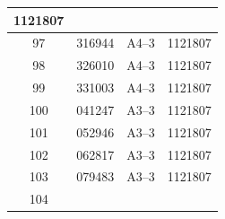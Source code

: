 \documentclass[UTF8,10pt,a4paper,fontset=fandol]{ctexart}
\newcommand{\fieldvalue}[1]{#1}
\begin{document}
\begin{center}
\begin{tabular}{|c|l|c|c|}
\fieldvalue{1121807}
\\ \hline
\fieldvalue{97} &
\fieldvalue{316944} &
\fieldvalue{A4--3} &
\fieldvalue{1121807}
\\ \hline
\fieldvalue{98} &
\fieldvalue{326010} &
\fieldvalue{A4--3} &
\fieldvalue{1121807}
\\ \hline
\fieldvalue{99} &
\fieldvalue{331003} &
\fieldvalue{A4--3} &
\fieldvalue{1121807}
\\ \hline
\fieldvalue{100} &
\fieldvalue{041247} &
\fieldvalue{A3--3} &
\fieldvalue{1121807}
\\ \hline
\fieldvalue{101} &
\fieldvalue{052946} &
\fieldvalue{A3--3} &
\fieldvalue{1121807}
\\ \hline
\fieldvalue{102} &
\fieldvalue{062817} &
\fieldvalue{A3--3} &
\fieldvalue{1121807}
\\ \hline
\fieldvalue{103} &
\fieldvalue{079483} &
\fieldvalue{A3--3} &
\fieldvalue{1121807}
\\ \hline
\fieldvalue{104} &

\end{tabular}
\end{center}
\end{document}
